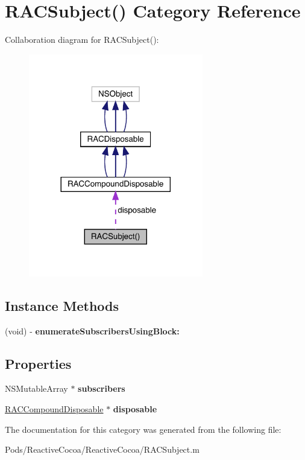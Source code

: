 \hypertarget{category_r_a_c_subject_07_08}{}\section{R\+A\+C\+Subject() Category Reference}
\label{category_r_a_c_subject_07_08}


Collaboration diagram for R\+A\+C\+Subject()\+:\nopagebreak
\begin{figure}[H]
\begin{center}
\leavevmode
\includegraphics[width=216pt]{category_r_a_c_subject_07_08__coll__graph}
\end{center}
\end{figure}
\subsection*{Instance Methods}
\begin{DoxyCompactItemize}
\item 
\mbox{\label{category_r_a_c_subject_07_08_a70022f308b690283a11de5f7d114f68a}} 
(void) -\/ {\bfseries enumerate\+Subscribers\+Using\+Block\+:}
\end{DoxyCompactItemize}
\subsection*{Properties}
\begin{DoxyCompactItemize}
\item 
\mbox{\label{category_r_a_c_subject_07_08_a1b7a212aecd839582e3b0eb0ed9a0e18}} 
N\+S\+Mutable\+Array $\ast$ {\bfseries subscribers}
\item 
\mbox{\label{category_r_a_c_subject_07_08_af65b85f3a0b9a1ee9a5a9679e7e4fe1f}} 
\mbox{\hyperlink{interface_r_a_c_compound_disposable}{R\+A\+C\+Compound\+Disposable}} $\ast$ {\bfseries disposable}
\end{DoxyCompactItemize}


The documentation for this category was generated from the following file\+:\begin{DoxyCompactItemize}
\item 
Pods/\+Reactive\+Cocoa/\+Reactive\+Cocoa/R\+A\+C\+Subject.\+m\end{DoxyCompactItemize}

